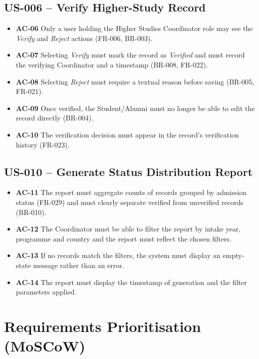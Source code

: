 \documentclass[11pt,a4paper]{article}
\begin{document}
\subsection*{US-006 -- Verify Higher-Study Record}
\begin{itemize}
  \item \textbf{AC-06} Only a user holding the Higher Studies Coordinator role may see the \emph{Verify} and \emph{Reject} actions (FR-006, BR-003).
  \item \textbf{AC-07} Selecting \emph{Verify} must mark the record as \emph{Verified} and must record the verifying Coordinator and a timestamp (BR-008, FR-022).
  \item \textbf{AC-08} Selecting \emph{Reject} must require a textual reason before saving (BR-005, FR-021).
  \item \textbf{AC-09} Once verified, the Student/Alumni must no longer be able to edit the record directly (BR-004).
  \item \textbf{AC-10} The verification decision must appear in the record's verification history (FR-023).
\end{itemize}

\subsection*{US-010 -- Generate Status Distribution Report}
\begin{itemize}
  \item \textbf{AC-11} The report must aggregate counts of records grouped by admission status (FR-029) and must clearly separate verified from unverified records (BR-010).
  \item \textbf{AC-12} The Coordinator must be able to filter the report by intake year, programme and country and the report must reflect the chosen filters.
  \item \textbf{AC-13} If no records match the filters, the system must display an empty-state message rather than an error.
  \item \textbf{AC-14} The report must display the timestamp of generation and the filter parameters applied.
\end{itemize}

\section{Requirements Prioritisation (MoSCoW)}
\end{document}
